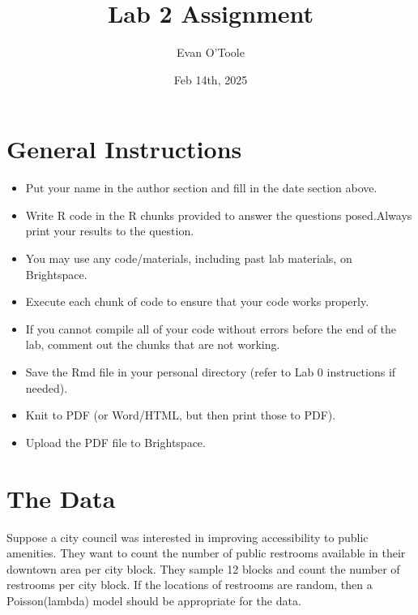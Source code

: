 \documentclass[
]{article}
\title{Lab 2 Assignment}
\author{Evan O'Toole}
\date{Feb 14th, 2025}
\providecommand{\tightlist}{%
  \setlength{\itemsep}{0pt}\setlength{\parskip}{0pt}}
\begin{document}
\maketitle

\hypertarget{general-instructions}{%
\section{General Instructions}\label{general-instructions}}

\begin{itemize}
\tightlist
\item
  Put your name in the author section and fill in the date section
  above.
\item
  Write R code in the R chunks provided to answer the questions
  posed.Always print your results to the question.
\item
  You may use any code/materials, including past lab materials, on
  Brightspace.
\item
  Execute each chunk of code to ensure that your code works properly.
\item
  If you cannot compile all of your code without errors before the end
  of the lab, comment out the chunks that are not working.
\item
  Save the Rmd file in your personal directory (refer to Lab 0
  instructions if needed).
\item
  Knit to PDF (or Word/HTML, but then print those to PDF).
\item
  Upload the PDF file to Brightspace.
\end{itemize}

\hypertarget{the-data}{%
\section{The Data}\label{the-data}}

Suppose a city council was interested in improving accessibility to
public amenities. They want to count the number of public restrooms
available in their downtown area per city block. They sample 12 blocks
and count the number of restrooms per city block. If the locations of
restrooms are random, then a Poisson(lambda) model should be appropriate
for the data.
\end{document}
